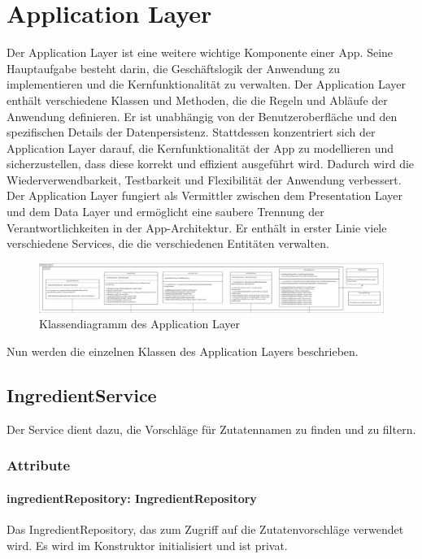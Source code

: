 \documentclass[parskip=full]{scrartcl}
\begin{document}
\section{Application Layer}
Der Application Layer ist eine weitere wichtige Komponente einer App. Seine Hauptaufgabe besteht darin, die Geschäftslogik der Anwendung zu implementieren und die Kernfunktionalität zu verwalten. Der Application Layer enthält verschiedene Klassen und Methoden, die die Regeln und Abläufe der Anwendung definieren. Er ist unabhängig von der Benutzeroberfläche und den spezifischen Details der Datenpersistenz. Stattdessen konzentriert sich der Application Layer darauf, die Kernfunktionalität der App zu modellieren und sicherzustellen, dass diese korrekt und effizient ausgeführt wird. Dadurch wird die Wiederverwendbarkeit, Testbarkeit und Flexibilität der Anwendung verbessert. Der Application Layer fungiert als Vermittler zwischen dem Presentation Layer und dem Data Layer und ermöglicht eine saubere Trennung der Verantwortlichkeiten in der App-Architektur. 
Er enthält in erster Linie viele verschiedene Services, die die verschiedenen Entitäten verwalten.
\begin{figure}[htp]
    \centering
    \includegraphics[width = \textwidth]{images/applicationLayer/applicationLayer.pdf}
    \caption{Klassendiagramm des Application Layer}
    \label{fig:application-layer}
\end{figure}

Nun werden die einzelnen Klassen des Application Layers beschrieben.

\subsection{IngredientService}
Der Service dient dazu, die Vorschläge für Zutatennamen zu finden und zu filtern.
\subsubsection{Attribute}
\paragraph{ingredientRepository: IngredientRepository}
Das IngredientRepository, das zum Zugriff auf die Zutatenvorschläge verwendet wird. Es wird im Konstruktor initialisiert und ist privat.
\end{document}
